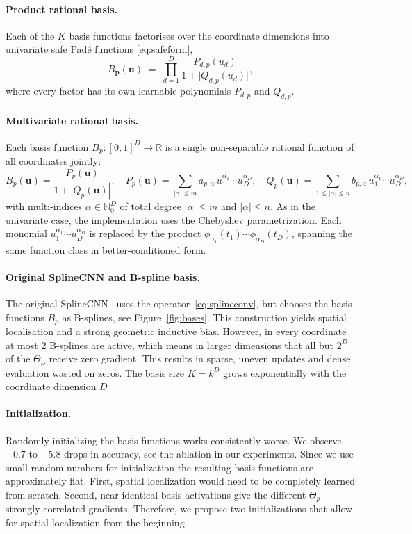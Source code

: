 \documentclass{article} %
\newcommand{\bu}{\mathbf{u}}
\newcommand{\R}{\mathbb{R}}
\begin{document}
\paragraph{Product rational basis.}
Each of the $K$ basis functions factorises over the coordinate dimensions into univariate safe Pad\'e functions
\eqref{eq:safeform},
\begin{equation}
B_{\mathbf p}(\bu) \;=\; \prod_{d=1}^{D}
\frac{P_{d,p}(u_d)}{1+\bigl|Q_{d,p}(u_d)\bigr|},
\label{eq:safepade}
\end{equation}
where every factor has its own learnable polynomials $P_{d,p}$ and $Q_{d,p}$.

\paragraph{Multivariate rational basis.}
Each basis function $B_p\colon[0,1]^D\to\R$ is a single non-separable rational function of all coordinates jointly:
\begin{equation}
B_p(\bu) = \frac{P_p(\bu)}{1+|Q_p(\bu)|},\quad
P_p(\bu)=\!\!\sum_{|\alpha|\le m}\! a_{p,\alpha}\,
u_1^{\alpha_1}\!\cdots u_D^{\alpha_D},\quad
Q_p(\bu)=\!\!\sum_{1\le|\alpha|\le n}\! b_{p,\alpha}\,
u_1^{\alpha_1}\!\cdots u_D^{\alpha_D},
\label{eq:multivariate}
\end{equation}
with multi-indices $\alpha\in\mathbb N_0^D$ of total degree $|\alpha|\le m$ and $|\alpha|\le n$.
As in the univariate case, the implementation uses the Chebyshev parametrization.
Each monomial $u_1^{\alpha_1}\!\cdots u_D^{\alpha_D}$ is replaced by the product $\phi_{\alpha_1}(t_1)\cdots\phi_{\alpha_D}(t_D)$, spanning the same function class in better-conditioned form.

\paragraph{Original SplineCNN and B-spline basis.}
The original SplineCNN~\cite{fey2018splinecnn} uses the operator~\eqref{eq:splineconv}, but chooses the basis functions $B_p$ as B-splines, see Figure~\ref{fig:bases}.
This construction yields spatial localisation and a strong geometric inductive bias.
However, in every coordinate at most 2 B-splines are active, which means in larger dimensions that all but $2^D$ of the $\Theta_{\mathbf p}$ receive zero gradient.
This results in sparse, uneven updates and dense evaluation wasted on zeros.
The basis size $K=k^D$ grows exponentially with the coordinate dimension $D$


\paragraph{Initialization.}
Randomly initializing the basis functions works consistently worse.
We observe $-0.7$ to $-5.8$ drops in accuracy, see the ablation in our experiments.
Since we use small random numbers for initialization the resulting basis functions are approximately flat.
First, spatial localization would need to be completely learned from scratch.
Second, near-identical basis activations give the different $\Theta_p$ strongly correlated gradients.
Therefore, we propose two initializations that allow for spatial localization from the beginning.
\end{document}
